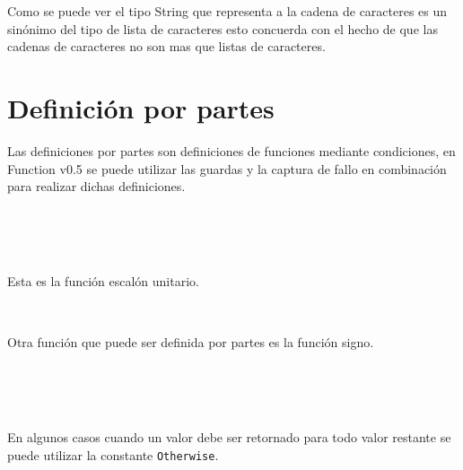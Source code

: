       Como se puede ver el tipo String que representa a la cadena de caracteres es un sinónimo del tipo de lista de caracteres esto concuerda con el hecho de que las cadenas de caracteres no son mas que listas de caracteres.
      
   \section{Definición por partes}
      Las definiciones por partes son definiciones de funciones mediante condiciones, en Function v0.5 se puede utilizar las guardas y la captura de fallo en combinación para realizar dichas definiciones.
      
      \begin{fxcode}
         \\
         \\ 
         \\
      \end{fxcode}
      
      Esta es la función escalón unitario.
      
      \begin{fxcode}
         \\
      \end{fxcode}
      
      Otra función que puede ser definida por partes es la función signo.
      
      \begin{fxcode}
         \\
         \\
         \\
      \end{fxcode}
      
      En algunos casos cuando un valor debe ser retornado para todo valor restante se puede utilizar la constante \texttt{Otherwise}.
      
      \begin{fxcode}
         \\
         \\
         \\
      \end{fxcode}
      
